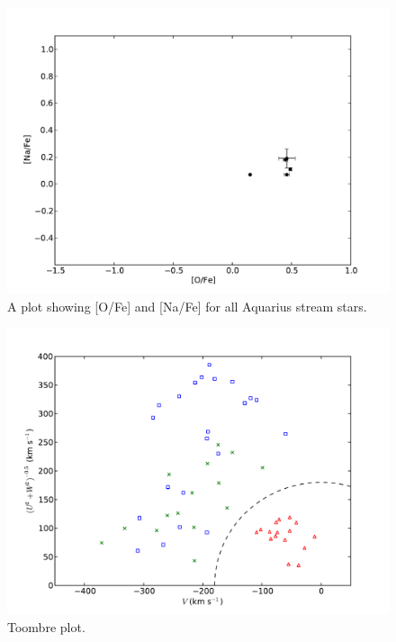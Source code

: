 \documentclass{emulateapj}
\begin{document}
\begin{figure}[h]
	\includegraphics[width=\columnwidth]{./figures/aquarius-o-na.pdf}
	\caption{A plot showing [O/Fe] and [Na/Fe] for all Aquarius stream stars.}
	\label{fig:o-na}
\end{figure}

\begin{figure}[h]
	\includegraphics[width=\columnwidth]{./figures/plot-toombre.pdf}
	\caption{Toombre plot.}
	\label{fig:toombre}
\end{figure}





\end{document}

